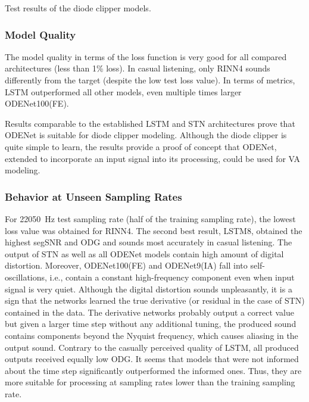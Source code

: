 
\begin{table}[]
    \caption{Test results of the diode clipper models.}
    
    \label{tab:diode_clipper_results}
\end{table}

\subsubsection{Model Quality}

The model quality in terms of the loss function is very good for all compared architectures (less than 1\% loss). In casual listening, only \ac{RINN}4 sounds differently from the target (despite the low test loss value). In terms of metrics, \ac{LSTM} outperformed all other models, even multiple times larger ODENet100(FE).

Results comparable to the established \ac{LSTM} and \ac{STN} architectures prove that ODENet is suitable for diode clipper modeling. Although the diode clipper is quite simple to learn, the results provide a proof of concept that ODENet, extended to incorporate an input signal into its processing, could be used for \ac{VA} modeling.

\subsubsection{Behavior at Unseen Sampling Rates}

For \SI{22050}{Hz} test sampling rate (half of the training sampling rate), the lowest loss value was obtained for \ac{RINN}4. The second best result, \ac{LSTM}8, obtained the highest \ac{segSNR} and \ac{ODG} and sounds most accurately in casual listening. The output of \ac{STN} as well as all ODENet models contain high amount of digital distortion. Moreover, ODENet100(FE) and ODENet9(IA) fall into self-oscillations, i.e., contain a constant high-frequency component even when input signal is very quiet. Although the digital distortion sounds unpleasantly, it is a sign that the networks learned the true derivative (or residual in the case of \ac{STN}) contained in the data. The derivative networks probably output a correct value but given a larger time step without any additional tuning, the produced sound contains components beyond the Nyquist frequency, which causes aliasing in the output sound. Contrary to the casually perceived quality of \ac{LSTM}, all produced outputs received equally low \ac{ODG}. It seems that models that were not informed about the time step significantly outperformed the informed ones. Thus, they are more suitable for processing at sampling rates lower than the training sampling rate.

